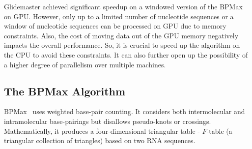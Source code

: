 Glidemaster\cite{Gildemaster2020} achieved significant speedup on a windowed version of the BPMax on GPU. However, only up to a limited number of nucleotide sequences or a window of nucleotide sequences can be processed on GPU due to memory constraints. Also, the cost of moving data out of the GPU memory negatively impacts the overall performance. So, it is crucial to speed up the algorithm on the CPU to avoid these constraints. It can also further open up the possibility of a higher degree of parallelism over multiple machines.

\subsection{The BPMax Algorithm}

BPMax~\cite{EbrahimpourBoroojeny2021} uses weighted base-pair counting.  It considers both intermolecular and intramolecular base-pairings but disallows pseudo-knots or crossings. Mathematically, it produces a four-dimensional triangular table - $F$-table (a triangular collection of triangles) based on two RNA sequences. 

